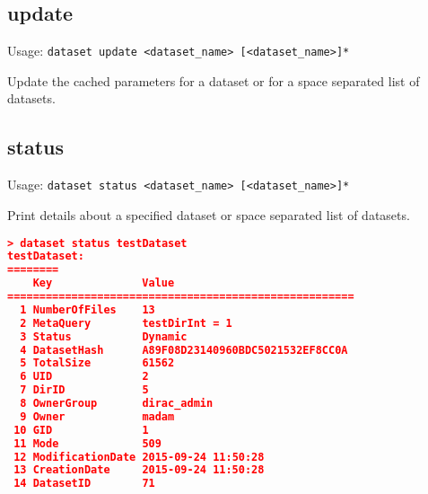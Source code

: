 \subsection{update}

Usage: \texttt{dataset update <dataset\_name> [<dataset\_name>]*}

Update the cached parameters for a dataset or for a space
separated list of datasets.

\pagebreak

\subsection{status}

Usage: \texttt{dataset status <dataset\_name> [<dataset\_name>]*}

Print details about a specified dataset or space separated list of
datasets.

\begin{lstlisting}[language=json]
> dataset status testDataset
testDataset:
========
    Key              Value
======================================================
  1 NumberOfFiles    13
  2 MetaQuery        testDirInt = 1
  3 Status           Dynamic
  4 DatasetHash      A89F08D23140960BDC5021532EF8CC0A
  5 TotalSize        61562
  6 UID              2
  7 DirID            5
  8 OwnerGroup       dirac_admin
  9 Owner            madam
 10 GID              1
 11 Mode             509
 12 ModificationDate 2015-09-24 11:50:28
 13 CreationDate     2015-09-24 11:50:28
 14 DatasetID        71
\end{lstlisting}

